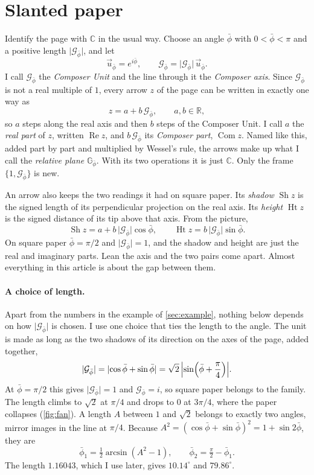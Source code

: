 \documentclass[11pt,a4paper]{article}
\theoremstyle{plain}
\theoremstyle{definition}
\newcommand{\pb}{\bar{\phi}}                     %
\newcommand{\Gp}{\mathcal{G}_{\bar{\phi}}}       %
\newcommand{\up}{\vec{u}_{\bar{\phi}}}           %
\newcommand{\GNp}{\mathbb{G}_{\bar{\phi}}}       %
\newcommand{\C}{\mathbb{C}}
\newcommand{\R}{\mathbb{R}}
\newcommand{\G}{\lvert\Gp\rvert}                 %
\renewcommand{\Re}{\operatorname{Re}}
\DeclareMathOperator{\Com}{Com}
\DeclareMathOperator{\Sh}{Sh}
\DeclareMathOperator{\Ht}{Ht}
\begin{document}
\section{Slanted paper}

Identify the page with $\C$ in the usual way. Choose an angle $\pb$ with $0 < \pb < \pi$ and a positive length $\G$, and let
\[
\up = e^{i\pb} , \qquad \Gp = \G\,\up .
\]
I call $\Gp$ the \emph{Composer Unit} and the line through it the \emph{Composer axis}. Since $\Gp$ is not a real multiple of $1$, every arrow $z$ of the page can be written in exactly one way as
\[
z = a + b\,\Gp , \qquad a, b \in \R ,
\]
so $a$ steps along the real axis and then $b$ steps of the Composer Unit. I call $a$ the \emph{real part} of $z$, written $\Re z$, and $b\,\Gp$ its \emph{Composer part}, $\Com z$. Named like this, added part by part and multiplied by Wessel's rule, the arrows make up what I call the \emph{relative plane} $\GNp$. With its two operations it is just $\C$. Only the frame $\{1, \Gp\}$ is new.

An arrow also keeps the two readings it had on square paper. Its \emph{shadow} $\Sh z$ is the signed length of its perpendicular projection on the real axis. Its \emph{height} $\Ht z$ is the signed distance of its tip above that axis. From the picture,
\begin{equation}\label{eq:shadow-height}
\Sh z = a + b\,\G\cos\pb , \qquad \Ht z = b\,\G\sin\pb .
\end{equation}
On square paper $\pb = \pi/2$ and $\G = 1$, and the shadow and height are just the real and imaginary parts. Lean the axis and the two pairs come apart. Almost everything in this article is about the gap between them.

\paragraph{A choice of length.} Apart from the numbers in the example of \cref{sec:example}, nothing below depends on how $\G$ is chosen. I use one choice that ties the length to the angle. The unit is made as long as the two shadows of its direction on the axes of the page, added together,
\begin{equation}\label{eq:axiom}
\G = \lvert\cos\pb + \sin\pb\rvert = \sqrt{2}\,\Bigl\lvert\sin\Bigl(\pb + \frac{\pi}{4}\Bigr)\Bigr\rvert .
\end{equation}
At $\pb = \pi/2$ this gives $\G = 1$ and $\Gp = i$, so square paper belongs to the family. The length climbs to $\sqrt{2}$ at $\pi/4$ and drops to $0$ at $3\pi/4$, where the paper collapses (\cref{fig:fan}). A length $A$ between $1$ and $\sqrt{2}$ belongs to exactly two angles, mirror images in the line at $\pi/4$. Because $A^2 = (\cos\pb + \sin\pb)^2 = 1 + \sin 2\pb$, they are
\[
\pb_1 = \tfrac{1}{2}\arcsin(A^2 - 1) , \qquad \pb_2 = \tfrac{\pi}{2} - \pb_1 .
\]
The length $1.16043$, which I use later, gives $10.14^\circ$ and $79.86^\circ$.
\end{document}
